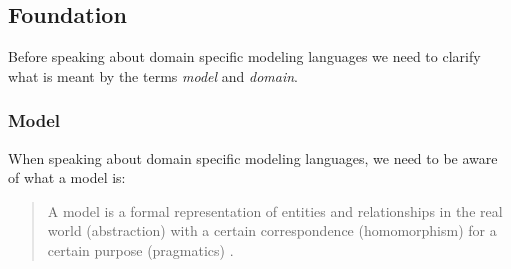 \documentclass[runningheads,a4paper]{llncs}
\begin{document}

\subsection{Foundation}
\label{subsec:introduction}
Before speaking about domain specific modeling languages we need to clarify what is meant by the 
terms \emph{model} and \emph{domain}.

\subsubsection{Model}
% 
%  
%  
  When speaking about domain specific modeling languages, we need to be aware of what a model is:
  
  \begin{quote}
   A model is a formal representation of entities and relationships in the real world (abstraction) 
  with a certain correspondence (homomorphism) for a certain purpose (pragmatics) \cite{stachowiak1973allgemein}.
  \end{quote}
  
\end{document}
